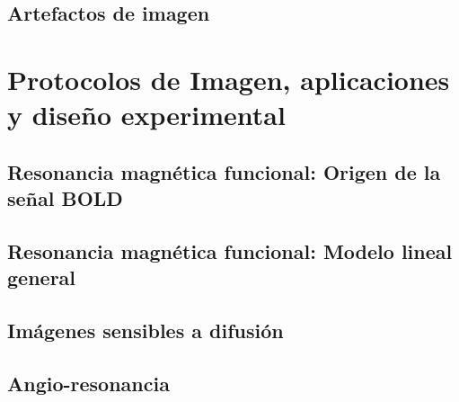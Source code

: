 \documentclass[]{memoir}          %
\begin{document}
\chapter{Artefactos de imagen}
\label{chapter_artefactos}






\part{Protocolos de Imagen, aplicaciones y diseño experimental}
\label{part_protocolos}


\chapter{Resonancia magnética funcional: Origen de la señal BOLD}
\label{chapter_bold}

\label{cap:origenBold}


\chapter{Resonancia magnética funcional: Modelo lineal general}



\chapter{Imágenes sensibles a difusión}
\label{chapter_difusion}


\chapter{Angio-resonancia}
\label{chapter_angio}

\end{document}
